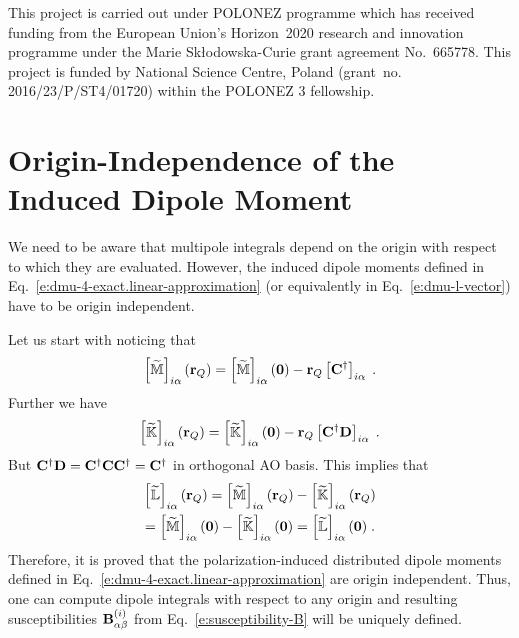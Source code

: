 \documentclass[aip,amsmath,amssymb,reprint,floatfix]{revtex4-1}
\begin{document}
\begin{acknowledgments}
This project is carried out under POLONEZ programme which has received funding from the European Union's
Horizon~2020 research and innovation programme under the Marie Skłodowska-Curie grant agreement 
No.~665778. This project is funded by National Science Centre, Poland 
(grant~no. 2016/23/P/ST4/01720) within the POLONEZ 3 fellowship.
\end{acknowledgments}

%
\appendix

\section{\label{a:orig-dep} Origin-Independence of the Induced Dipole Moment}

We need to be aware that multipole integrals depend on the origin with respect to which they are evaluated.
However, the induced dipole moments defined in Eq.~\eqref{e:dmu-4-exact.linear-approximation} 
(or equivalently in Eq.~\eqref{e:dmu-l-vector})
have to be origin independent. 

Let us start with noticing that
%
\begin{equation}
 \left[ \widetilde{\mathbb{M}} \right]_{i\alpha} ({\bf r}_Q) 
 = \left[ \widetilde{\mathbb{M}} \right]_{i\alpha} ({\bf 0}) - {\bf r}_Q \left[ {\bf C}^\dagger \right]_{i\alpha}  \;.
\end{equation}
%
Further we have
%
\begin{equation}
 \left[ \widetilde{\mathbb{K}} \right]_{i\alpha} ({\bf r}_Q) 
 = \left[ \widetilde{\mathbb{K}} \right]_{i\alpha} ({\bf 0}) - {\bf r}_Q \left[ {\bf C}^\dagger {\bf D} \right]_{i\alpha} \;.
\end{equation}
%
But ${\bf C}^\dagger {\bf D}={\bf C}^\dagger {\bf C} {\bf C}^\dagger={\bf C}^\dagger$ in orthogonal
AO basis. This implies that
%
\begin{multline}
   \left[ \widetilde{\mathbb{L}} \right]_{i\alpha} ({\bf r}_Q) 
 = \left[ \widetilde{\mathbb{M}} \right]_{i\alpha} ({\bf r}_Q) 
 - \left[ \widetilde{\mathbb{K}} \right]_{i\alpha} ({\bf r}_Q) \\
 = \left[ \widetilde{\mathbb{M}} \right]_{i\alpha} ({\bf 0})   
 - \left[ \widetilde{\mathbb{K}} \right]_{i\alpha} ({\bf 0})
 = \left[ \widetilde{\mathbb{L}} \right]_{i\alpha} ({\bf 0}) \;.
\end{multline}
%
Therefore, it is proved that the polarization\hyp{}induced distributed dipole moments 
defined in Eq.~\eqref{e:dmu-4-exact.linear-approximation} 
are origin independent.
Thus, one can compute dipole integrals with respect to any origin and resulting
susceptibilities ${\bf B}_{\alpha\beta}^{(i)}$ from Eq.~\eqref{e:susceptibility-B} will be uniquely defined.
\end{document}
